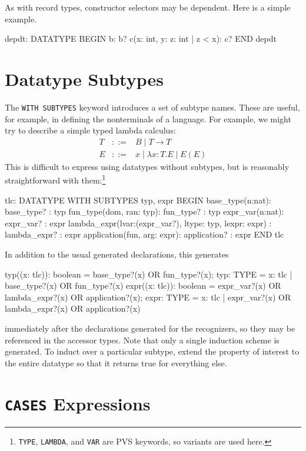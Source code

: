 As with record types, constructor selectors may be dependent.  Here is a
simple example.
\begin{session}
  depdt: DATATYPE
   BEGIN
    b: b?
    c(x: int, y: \setb{}z: int | z < x\sete): c?
   END depdt
\end{session}

\section{Datatype Subtypes}

The \texttt{WITH SUBTYPES} keyword introduces a set of subtype names.
These are useful, for example, in defining the nonterminals of a language.
For example, we might try to describe a simple typed lambda calculus:
\begin{eqnarray*}
T & ::= & B \;|\; T \rightarrow T \\
E & ::= & x \;|\; \lambda x:T.E \;|\; E(E)
\end{eqnarray*}
This is difficult to express using datatypes without subtypes, but is
reasonably straightforward with them:\footnote{\texttt{TYPE},
\texttt{LAMBDA}, and \texttt{VAR} are PVS keywords, so variants are used
here.}
\begin{session}
tlc: DATATYPE WITH SUBTYPES typ, expr
 BEGIN
 base_type(n:nat): base_type? : typ
 fun_type(dom, ran: typ): fun_type? : typ
 expr_var(n:nat): expr_var? : expr
 lambda_expr(lvar:(expr_var?), ltype: typ, lexpr: expr)
                            : lambda_expr? : expr
 application(fun, arg: expr): application? : expr
 END tlc
\end{session}
In addition to the usual generated declarations, this generates
\begin{session}
  typ((x: tlc)): boolean = base_type?(x) OR fun_type?(x);
  typ: TYPE = \setb{}x: tlc | base_type?(x) OR fun_type?(x)\sete
  expr((x: tlc)): boolean =
     expr_var?(x) OR lambda_expr?(x) OR application?(x);
  expr: TYPE =
     \setb{}x: tlc | expr_var?(x) OR lambda_expr?(x) OR application?(x)\sete
\end{session}
immediately after the declarations generated for the recognizers, so they
may be referenced in the accessor types.  Note that only a single
induction scheme is generated.  To induct over a particular subtype,
extend the property of interest to the entire datatype so that it returns
true for everything else.


\section{\texttt{CASES} Expressions}\label{cases-expressions}

